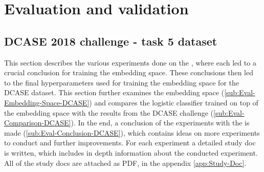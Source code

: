 \chapter{Evaluation and validation}
\label{ch:Evalutation-Validation}

\section{DCASE 2018 challenge - task 5 dataset}
\label{sec:Results-DCASE}
This section describes the various experiments done on the , where each led to a crucial conclusion for training the embedding space. These conclusions then led to the final hyperparameters used for training the embedding space for the DCASE dataset. This section further examines the embedding space (\ref{sub:Eval-Embedding-Space-DCASE}) and compares the logistic classifier trained on top of the embedding space with the results from the DCASE challenge (\ref{sub:Eval-Comparison-DCASE}). In the end, a conclusion of the experiments with the  is made (\ref{sub:Eval-Conclusion-DCASE}), which contains ideas on more experiments to conduct and further improvements.
\newline
\newline
For each experiment a detailed study doc is written, which includes in depth information about the conducted experiment. All of the study docs are attached as PDF, in the appendix \ref{app:Study-Doc}.

